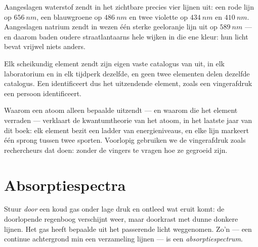 \begin{example}\label{ex:g10:light-spectra:hydrogen}
Aangeslagen waterstof zendt in het zichtbare precies vier lijnen uit: een
rode lijn op $\qty{656}{nm}$, een blauwgroene op $\qty{486}{nm}$ en twee
violette op $\qty{434}{nm}$ en $\qty{410}{nm}$. Aangeslagen natrium zendt
in wezen één sterke geeloranje lijn uit op $\qty{589}{nm}$ --- en daarom
baden oudere straatlantaarns hele wijken in die ene kleur: hun licht
bevat vrijwel niets anders.
\end{example}

\begin{proposition}\label{prop:g10:light-spectra:fingerprint}
Elk scheikundig element zendt zijn eigen vaste catalogus van
 uit, in elk laboratorium en in elk tijdperk dezelfde, en
geen twee elementen delen dezelfde catalogus. Een 
identificeert dus het uitzendende element, zoals een vingerafdruk een
persoon identificeert.
\end{proposition}
\admitted

\begin{remark}\label{rem:g10:light-spectra:whylines}
Waarom een atoom alleen bepaalde  uitzendt --- en waarom die
 het element verraden --- verklaart de kwantumtheorie van het
atoom, in het laatste jaar van dit boek: elk element bezit een ladder van
energieniveaus, en elke lijn markeert één sprong tussen twee sporten.
Voorlopig gebruiken we de vingerafdruk zoals rechercheurs dat doen:
zonder de vingers te vragen hoe ze gegroeid zijn.
\end{remark}

\section{Absorptiespectra}

\begin{definition}[Absorptiespectrum]\label{def:g10:light-spectra:absorption}
Stuur  \emph{door} een koud gas onder lage druk en ontleed wat
eruit komt: de doorlopende regenboog verschijnt weer, maar doorkrast met
dunne donkere lijnen. Het gas heeft bepaalde  uit het
passerende licht weggenomen. Zo'n  --- een continue achtergrond
min een verzameling lijnen --- is een
\emph{absorptiespectrum}.
\end{definition}

